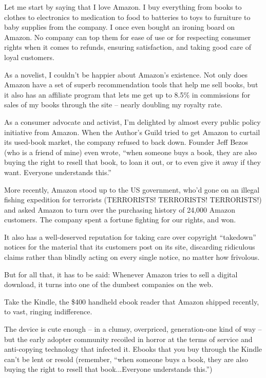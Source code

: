 Let me start by saying that I love Amazon. I buy everything from
books to clothes to electronics to medication to food to batteries
to toys to furniture to baby supplies from the company. I once even
bought an ironing board on Amazon. No company can top them for ease
of use or for respecting consumer rights when it comes to refunds,
ensuring satisfaction, and taking good care of loyal customers.

As a novelist, I couldn't be happier about Amazon's existence. Not
only does Amazon have a set of superb recommendation tools that
help me sell books, but it also has an affiliate program that lets
me get up to 8.5\% in commissions for sales of my books through the
site -- nearly doubling my royalty rate.

As a consumer advocate and activist, I'm delighted by almost every
public policy initiative from Amazon. When the Author's Guild tried
to get Amazon to curtail its used-book market, the company refused
to back down. Founder Jeff Bezos (who is a friend of mine) even
wrote, ``when someone buys a book, they are also buying the right to
resell that book, to loan it out, or to even give it away if they
want. Everyone understands this.''

More recently, Amazon stood up to the US government, who'd gone on
an illegal fishing expedition for terrorists (TERRORISTS!
TERRORISTS! TERRORISTS!) and asked Amazon to turn over the
purchasing history of 24,000 Amazon customers. The company spent a
fortune fighting for our rights, and won.

It also has a well-deserved reputation for taking care over
copyright ``takedown'' notices for the material that its customers
post on its site, discarding ridiculous claims rather than blindly
acting on every single notice, no matter how frivolous.

But for all that, it has to be said: Whenever Amazon tries to sell
a digital download, it turns into one of the dumbest companies on
the web.

Take the Kindle, the \$400 handheld ebook reader that Amazon
shipped recently, to vast, ringing indifference.

The device is cute enough -- in a clumsy, overpriced, generation-one
kind of way -- but the early adopter community recoiled in horror at
the terms of service and anti-copying technology that infected it.
Ebooks that you buy through the Kindle can't be lent or resold
(remember, ``when someone buys a book, they are also buying the
right to resell that book...Everyone understands this.'')

